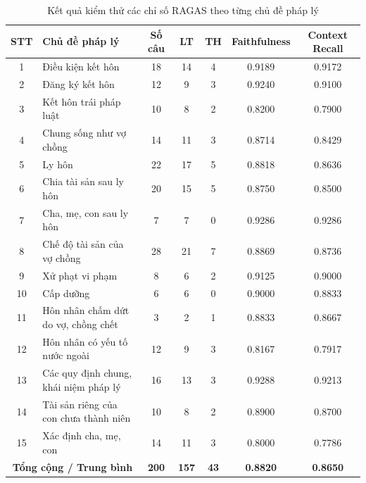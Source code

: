 \documentclass[../DoAn.tex]{subfiles}
\begin{document}
\begin{table}[H]
\centering
\small
\begin{tabular}{|c|p{3cm}|c|c|c|c|c|}
\hline
\textbf{STT} & \textbf{Chủ đề pháp lý} & \textbf{Số câu} & \textbf{LT} & \textbf{TH} & \textbf{Faithfulness} & \textbf{Context Recall} \\ \hline

1 & Điều kiện kết hôn & 18 & 14 & 4 & 0.9189 & 0.9172 \\ \hline
2 & Đăng ký kết hôn & 12 & 9 & 3 & 0.9240 & 0.9100 \\ \hline
3 & Kết hôn trái pháp luật & 10 & 8 & 2 & 0.8200 & 0.7900 \\ \hline
4 & Chung sống như vợ chồng & 14 & 11 & 3 & 0.8714 & 0.8429 \\ \hline
5 & Ly hôn & 22 & 17 & 5 & 0.8818 & 0.8636 \\ \hline
6 & Chia tài sản sau ly hôn & 20 & 15 & 5 & 0.8750 & 0.8500 \\ \hline
7 & Cha, mẹ, con sau ly hôn & 7 & 7 & 0 & 0.9286 & 0.9286 \\ \hline
8 & Chế độ tài sản của vợ chồng & 28 & 21 & 7 & 0.8869 & 0.8736 \\ \hline
9 & Xử phạt vi phạm & 8 & 6 & 2 & 0.9125 & 0.9000 \\ \hline
10 & Cấp dưỡng & 6 & 6 & 0 & 0.9000 & 0.8833 \\ \hline
11 & Hôn nhân chấm dứt do vợ, chồng chết & 3 & 2 & 1 & 0.8833 & 0.8667 \\ \hline
12 & Hôn nhân có yếu tố nước ngoài & 12 & 9 & 3 & 0.8167 & 0.7917 \\ \hline
13 & Các quy định chung, khái niệm pháp lý & 16 & 13 & 3 & 0.9288 & 0.9213 \\ \hline
14 & Tài sản riêng của con chưa thành niên & 10 & 8 & 2 & 0.8900 & 0.8700 \\ \hline
15 & Xác định cha, mẹ, con & 14 & 11 & 3 & 0.8000 & 0.7786 \\ \hline

\multicolumn{2}{|c|}{\textbf{Tổng cộng / Trung bình}} & \textbf{200} & \textbf{157} & \textbf{43} & \textbf{0.8820} & \textbf{0.8650} \\ \hline
\end{tabular}
\caption{Kết quả kiểm thử các chỉ số RAGAS theo từng chủ đề pháp lý}
\label{table:ragas_results}
\end{table}
\end{document}
